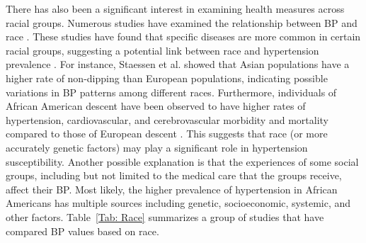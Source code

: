\documentclass[journal,article,moreauthors]{Definitions/mdpi}
\begin{document}
There has also been a significant interest in examining health measures across racial groups. Numerous studies have examined the relationship between BP and race \citep{Jones2006, hardy2021racial}. These studies have found that specific diseases are more common in certain racial groups, suggesting a potential link between race and hypertension prevalence \citep{Cooper1998, fryar2017hypertension}. For instance, Staessen et al. \citep{staessen1997nocturnal} showed that Asian populations have a higher rate of non-dipping than European populations, indicating possible variations in BP patterns among different races. Furthermore, individuals of African American descent have been observed to have higher rates of hypertension, cardiovascular, and cerebrovascular morbidity and mortality compared to those of European descent \citep{mayet1998ethnic}. This suggests that race (or more accurately genetic factors) may play a significant role in hypertension susceptibility. Another possible explanation is that the experiences of some social groups, including but not limited to the medical care that the groups receive, affect their BP. Most likely, the higher prevalence of hypertension in African Americans has multiple sources including genetic, socioeconomic, systemic, and other factors. Table~\ref{Tab: Race} summarizes a group of studies that have compared BP values based on race. 
\end{document}
